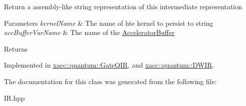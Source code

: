 Return a assembly-\/like string representation of this intermediate representation


\begin{DoxyParams}{Parameters}
{\em kernel\+Name} & The name of hte kernel to persist to string \\
\hline
{\em acc\+Buffer\+Var\+Name} & The name of the \hyperlink{a01625}{Accelerator\+Buffer} \\
\hline
\end{DoxyParams}
\begin{DoxyReturn}{Returns}

\end{DoxyReturn}


Implemented in \hyperlink{a01265_a7153f7e9f516d43af3d5d4f95d60bd86}{xacc\+::quantum\+::\+Gate\+Q\+IR}, and \hyperlink{a01217_a880cb60197577ea31115331e3a030e3e}{xacc\+::quantum\+::\+D\+W\+IR}.



The documentation for this class was generated from the following file\+:\begin{DoxyCompactItemize}
\item 
I\+R.\+hpp\end{DoxyCompactItemize}
